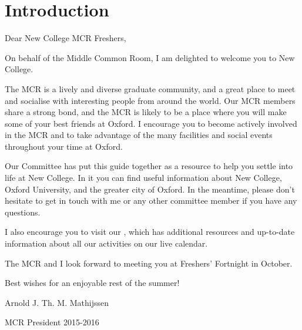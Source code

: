 
\chapter{Introduction}

Dear New College MCR Freshers,

\medskip

\noindent On behalf of the Middle Common Room, I am delighted to welcome you to New College. 

\medskip

\noindent The MCR is a lively and diverse graduate community, and a great place
to meet and socialise with interesting people from around the world. Our MCR members share a strong bond, and the MCR is likely to be a place where you will make some of your best friends at Oxford. I encourage you to become actively involved in the MCR and to take advantage of the many facilities and social events throughout your time at Oxford.

\medskip

\noindent Our Committee has put this guide together as a resource to help you
settle into life at New College. In it you can find useful information about New College, Oxford University, and the greater city of Oxford. In the meantime, please don't hesitate to get in touch with me or any other committee member if you have any questions.

\medskip

\noindent I also encourage you to visit our
\href{http://mcr.new.ox.ac.uk/?n=Main.HomePage}{}, which has
additional resources and up-to-date information about all our activities on our live calendar.

\medskip

\noindent The MCR and I look forward to meeting you at Freshers' Fortnight in
October.

\medskip

\noindent Best wishes for an enjoyable rest of the summer!

\bigskip

\noindent Arnold J. Th. M. Mathijssen

\noindent \footnotesize{MCR President 2015-2016

\noindent
\href{mailto:Arnold.Mathijssen@new.ox.ac.uk}{}}
